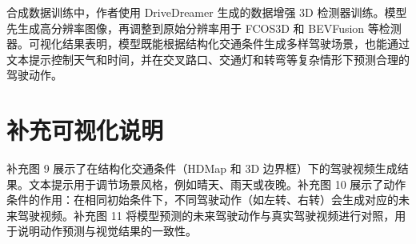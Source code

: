 \documentclass[10pt]{article}
\begin{document}
合成数据训练中，作者使用 DriveDreamer 生成的数据增强 3D 检测器训练。模型先生成高分辨率图像，再调整到原始分辨率用于 FCOS3D 和 BEVFusion 等检测器。可视化结果表明，模型既能根据结构化交通条件生成多样驾驶场景，也能通过文本提示控制天气和时间，并在交叉路口、交通灯和转弯等复杂情形下预测合理的驾驶动作。

\section*{补充可视化说明}

补充图 9 展示了在结构化交通条件（HDMap 和 3D 边界框）下的驾驶视频生成结果。文本提示用于调节场景风格，例如晴天、雨天或夜晚。补充图 10 展示了动作条件的作用：在相同初始条件下，不同驾驶动作（如左转、右转）会生成对应的未来驾驶视频。补充图 11 将模型预测的未来驾驶动作与真实驾驶视频进行对照，用于说明动作预测与视觉结果的一致性。
\end{document}
